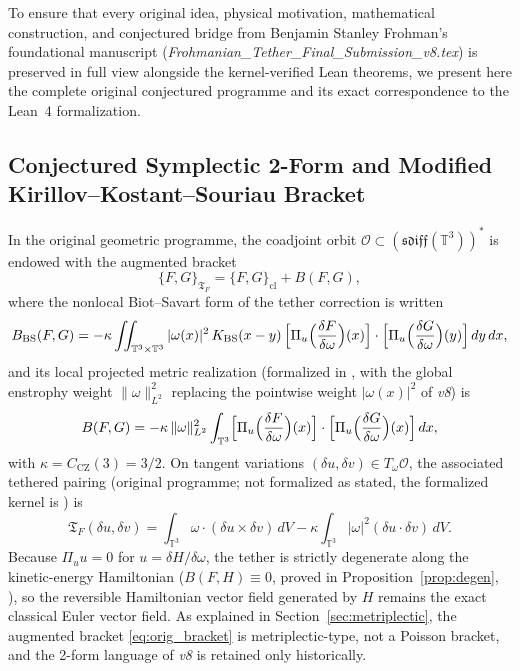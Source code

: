 \documentclass[11pt,a4paper]{article}
\theoremstyle{plain}
\theoremstyle{definition}
\theoremstyle{remark}
\newcommand{\T}{\mathbb{T}^3}
\newcommand{\Tf}{\mathfrak{T}_F}
\newcommand{\CZ}{C_{\mathrm{CZ}}}
\begin{document}
To ensure that every original idea, physical motivation, mathematical construction, and conjectured bridge from Benjamin Stanley Frohman's foundational manuscript (\emph{Frohmanian\_Tether\_Final\_Submission\_v8.tex}) is preserved in full view alongside the kernel-verified Lean theorems, we present here the complete original conjectured programme and its exact correspondence to the Lean~4 formalization.

\subsection{Conjectured Symplectic 2-Form and Modified Kirillov--Kostant--Souriau Bracket}
In the original geometric programme, the coadjoint orbit $\mathcal{O}\subset(\mathfrak{sdiff}(\T))^*$ is endowed with the augmented bracket
\begin{equation}\label{eq:orig_bracket}
\{F,G\}_{\Tf} = \{F,G\}_{\mathrm{cl}} + B(F,G),
\end{equation}
where the nonlocal Biot--Savart form of the tether correction is written
\begin{equation}\label{eq:orig_nonlocal_B}
B_{\mathrm{BS}}(F,G) = -\kappa \iint_{\T\times\T} |\omega(x)|^2\,K_{\mathrm{BS}}(x-y)\,\Bigl[\Pi_u\Bigl(\frac{\delta F}{\delta\omega}\Bigr)(x)\Bigr]\cdot\Bigl[\Pi_u\Bigl(\frac{\delta G}{\delta\omega}\Bigr)(y)\Bigr]\,dy\,dx,
\end{equation}
and its local projected metric realization (formalized in , with the global enstrophy weight $\|\omega\|_{L^2}^2$ replacing the pointwise weight $|\omega(x)|^2$ of \emph{v8}) is
\begin{equation}\label{eq:orig_local_B}
B(F,G) = -\kappa\,\|\omega\|_{L^2}^2 \int_{\T} \Bigl[\Pi_u\Bigl(\frac{\delta F}{\delta\omega}\Bigr)(x)\Bigr]\cdot\Bigl[\Pi_u\Bigl(\frac{\delta G}{\delta\omega}\Bigr)(x)\Bigr]\,dx,
\end{equation}
with $\kappa = \CZ(3) = 3/2$. On tangent variations $(\delta u,\delta v)\in T_\omega\mathcal{O}$, the associated tethered pairing (original programme; not formalized as stated, the formalized kernel is ) is
\begin{equation}\label{eq:orig_2form}
\Tf(\delta u,\delta v) = \int_{\T}\omega\cdot(\delta u\times\delta v)\,dV - \kappa\int_{\T}|\omega|^2(\delta u\cdot\delta v)\,dV.
\end{equation}
Because $\Pi_u u = 0$ for $u=\delta H/\delta\omega$, the tether is strictly degenerate along the kinetic-energy Hamiltonian ($B(F,H)\equiv0$, proved in Proposition~\ref{prop:degen}, ), so the reversible Hamiltonian vector field generated by $H$ remains the exact classical Euler vector field. As explained in Section~\ref{sec:metriplectic}, the augmented bracket \eqref{eq:orig_bracket} is metriplectic-type, not a Poisson bracket, and the 2-form language of \emph{v8} is retained only historically.
\end{document}
